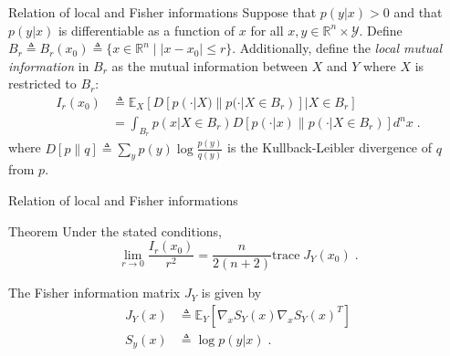 \documentclass{beamer}
\begin{document}
	\begin{frame}{Relation of local and Fisher informations}
		Suppose that $p(y|x) > 0$ and that $p(y|x)$ is differentiable as a function of $x$ for all $x,y \in \mathbb{R}^n \times \mathcal{Y}$. Define $B_r \triangleq B_r(x_0) \triangleq \{ x \in \mathbb{R}^n \;|\; \lvert{x - x_0}\rvert \leq r \}$. Additionally, define the \emph{local mutual information} in $B_r$ as the mutual information between $X$ and $Y$ where $X$ is restricted to $B_r$:
		\begin{align}
			I_r(x_0) &\triangleq \mathbb{E}_X[D[p(\cdot|X)\| p(\cdot|X \in B_r)]|X \in B_r] \\
			&= \int_{B_r} p(x|X \in B_r) D[p(\cdot|x)\| p(\cdot|X \in B_r)] d^n x\;.
		\end{align}
		where $D[p\|q] \triangleq \sum_{y} p(y) \log \frac{p(y)}{q(y)}$ is the Kullback-Leibler divergence of $q$ from $p$. 
	\end{frame}
	\begin{frame}{Relation of local and Fisher informations}
		\begin{block}{Theorem}
		Under the stated conditions, 
			\begin{equation}
				\lim_{r\rightarrow 0} \frac{I_r(x_0)}{r^2} = \frac{n}{2(n+2)} \text{trace}\; J_Y(x_0)\;.
			\end{equation}
		\end{block}
			The Fisher information matrix $J_Y$ is given by 
			\begin{align}
				J_Y(x) &\triangleq \mathbb{E}_Y\left[\nabla_x S_{Y}(x)\nabla_x S_{Y}(x)^T \right] \\
				S_y(x) &\triangleq \log p(y|x)\;.
			\end{align}
	\end{frame}
\end{document}

